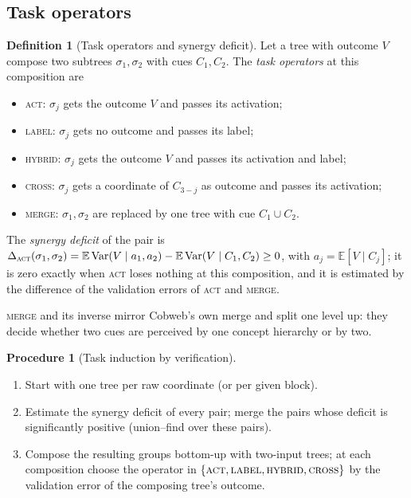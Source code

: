 \documentclass[11pt]{article}
\theoremstyle{definition}
\newtheorem{definition}[theorem]{Definition}
\newtheorem{procedure}[theorem]{Procedure}
\theoremstyle{remark}
\newcommand{\E}{\mathbb{E}}
\newcommand{\Var}{\operatorname{Var}}
\begin{document}
\subsection{Task operators}

\begin{definition}[Task operators and synergy deficit]\label{def:operators}
Let a tree with outcome $V$ compose two subtrees $\sigma_1,\sigma_2$ with cues
$C_1,C_2$.  The \emph{task operators} at this composition are
\begin{itemize}[leftmargin=*,noitemsep]
\item \textsc{act}: $\sigma_j$ gets the outcome $V$ and passes its activation;
\item \textsc{label}: $\sigma_j$ gets no outcome and passes its label;
\item \textsc{hybrid}: $\sigma_j$ gets the outcome $V$ and passes its activation and label;
\item \textsc{cross}: $\sigma_j$ gets a coordinate of $C_{3-j}$ as outcome and passes its
  activation;
\item \textsc{merge}: $\sigma_1,\sigma_2$ are replaced by one tree with cue $C_1\cup C_2$.
\end{itemize}
The \emph{synergy deficit} of the pair is
$\Delta_{\textsc{act}}(\sigma_1,\sigma_2)=\E\Var(V\mid a_1,a_2)-\E\Var(V\mid C_1,C_2)\ge0$,
with $a_j=\E[V\mid C_j]$; it is zero exactly when \textsc{act} loses nothing at this
composition, and it is estimated by the difference of the validation errors of
\textsc{act} and \textsc{merge}.
\end{definition}

\textsc{merge} and its inverse mirror Cobweb's own merge and split one level up: they
decide whether two cues are perceived by one concept hierarchy or by two.

\begin{procedure}[Task induction by verification]\label{proc:induction}
\leavevmode
\begin{enumerate}[leftmargin=*,noitemsep]
\item Start with one tree per raw coordinate (or per given block).
\item Estimate the synergy deficit of every pair; merge the pairs whose deficit is
  significantly positive (union--find over these pairs).
\item Compose the resulting groups bottom-up with two-input trees; at each composition
  choose the operator in $\{\textsc{act},\textsc{label},\textsc{hybrid},\textsc{cross}\}$
  by the validation error of the composing tree's outcome.
\end{enumerate}
\end{procedure}
\end{document}
